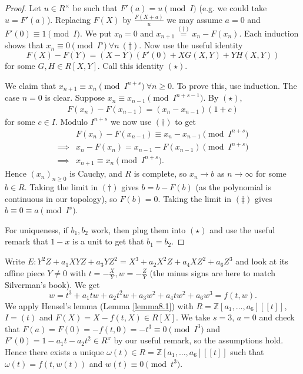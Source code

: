 \documentclass{article}
\theoremstyle{definition}
\begin{document}
\begin{proof}
    Let $u \in R^\times$ be such that $F'(a) = u \pmod{I}$ (e.g. we could take $u = F'(a)$). Replacing $F(X)$ by $\frac{F(X+a)}{u}$ we may assume $a = 0$ and ${F'(0) \equiv 1 \pmod{I}}$. We put $x_0 = 0$ and $x_{n+1} \stackrel{(\dagger)}{=}  x_n - F(x_n)$. Each induction shows that $x_n \equiv 0 \pmod{I^s} ~\forall n ~ (\ddagger)$. Now use the useful identity $$F(X)-F(Y)=(X-Y)(F'(0) + XG(X,Y) + YH(X,Y))$$
    for some $G,H \in R[X,Y]$. Call this identity $(\star)$.
    \vspace{1mm}
     
    We claim that $x_{n+1} \equiv x_n \pmod{I^{n+s}} ~\forall n\ge 0$. To prove this, use induction. The case $n=0$ is clear. Suppose $x_n \equiv x_{n-1} \pmod{I^{n+s-1}}$. By $(\star)$, 
    \begin{align*}
        F(x_n) - F(x_{n-1}) = (x_n-x_{n-1})(1+c)
    \end{align*}
    for some $c \in I$. Modulo $I^{n+s}$ we now use $(\dagger)$ to get
    \begin{align*}
        &F(x_n) - F(x_{n-1}) \equiv x_n-x_{n-1} \pmod{I^{n+s}} \\
        \implies & x_n - F(x_n) = x_{n-1} - F(x_{n-1}) \pmod{I^{n+s}}\\
        \implies & x_{n+1} \equiv x_n \pmod{I^{n+s}}.
    \end{align*}
    Hence $(x_n)_{n\ge 0}$ is Cauchy, and $R$ is complete, so $x_n \to b$ as $n \to \infty$ for some $b \in R$. Taking the limit in $(\dagger)$ gives $b = b - F(b)$ (as the polynomial is continuous in our topology), so $F(b) = 0$. Taking the limit in $(\ddagger)$ gives $b \equiv 0 \equiv a\pmod{I^s}$.

    \vspace{1mm}
     
    For uniqueness, if $b_1,b_2$ work, then plug them into $(\star)$ and use the useful remark that $1-x$ is a unit to get that $b_1=b_2$. 
\end{proof}
Write $E: Y^2Z + a_1 XYZ + a_3 YZ^2 = X^3 + a_2 X^2Z + a_4 XZ^2 + a_6 Z^3$ and look at its affine piece $Y \neq 0$ with $t = -\frac{X}{Y}, w = -\frac{Z}{Y}$ (the minus signs are here to match Silverman's book). We get $$w = t^3 + a_1 tw + a_2 t^2w + a_3w^2 + a_4 tw^2+ a_6w^3 = f(t,w).$$
We apply Hensel's lemma (Lemma \ref{lemma8.1}) with $R = \mathbb{Z}[a_1,\ldots,a_6][[t]]$, $I = (t)$ and $F(X) = X - f(t,X) \in R[X]$. We take $s=3$, $a=0$ and check that $F(a) = F(0) = -f(t,0) = -t^3 \equiv 0 \pmod{I^3}$ and $F'(0) = 1 - a_1t - a_2t^2 \in R^x$ by our useful remark, so the assumptions hold. Hence there exists a unique $\omega(t) \in R = \mathbb{Z}[a_1,\ldots,a_6][[t]]$ such that $\omega(t) = f(t,w(t))$ and $w(t) \equiv 0 \pmod{t^3}$.
\end{document}
